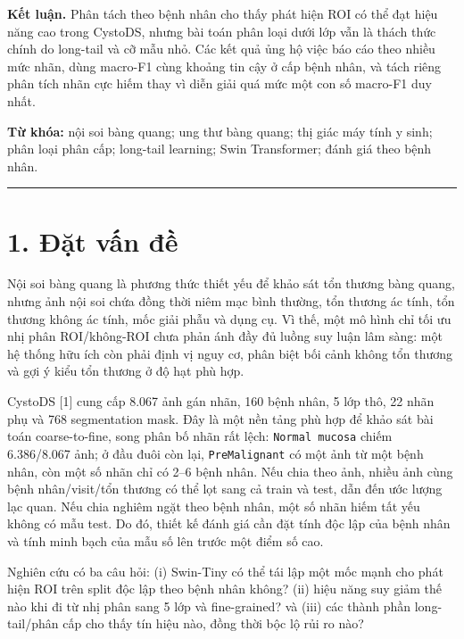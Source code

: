 \documentclass[
  10pt,
  a4paper,
  twocolumn]{article}
\begin{document}
\textbf{Kết luận.} Phân tách theo bệnh nhân cho thấy phát hiện ROI có
thể đạt hiệu năng cao trong CystoDS, nhưng bài toán phân loại dưới lớp
vẫn là thách thức chính do long-tail và cỡ mẫu nhỏ. Các kết quả ủng hộ
việc báo cáo theo nhiều mức nhãn, dùng macro-F1 cùng khoảng tin cậy ở
cấp bệnh nhân, và tách riêng phân tích nhãn cực hiếm thay vì diễn giải
quá mức một con số macro-F1 duy nhất.

\textbf{Từ khóa:} nội soi bàng quang; ung thư bàng quang; thị giác máy
tính y sinh; phân loại phân cấp; long-tail learning; Swin Transformer;
đánh giá theo bệnh nhân.

\begin{center}\rule{0.5\linewidth}{0.5pt}\end{center}

\section{1. Đặt vấn đề}\label{ux111ux1eb7t-vux1ea5n-ux111ux1ec1}

Nội soi bàng quang là phương thức thiết yếu để khảo sát tổn thương bàng
quang, nhưng ảnh nội soi chứa đồng thời niêm mạc bình thường, tổn thương
ác tính, tổn thương không ác tính, mốc giải phẫu và dụng cụ. Vì thế, một
mô hình chỉ tối ưu nhị phân ROI/không-ROI chưa phản ánh đầy đủ luồng suy
luận lâm sàng: một hệ thống hữu ích còn phải định vị nguy cơ, phân biệt
bối cảnh không tổn thương và gợi ý kiểu tổn thương ở độ hạt phù hợp.

CystoDS {[}1{]} cung cấp 8.067 ảnh gán nhãn, 160 bệnh nhân, 5 lớp thô,
22 nhãn phụ và 768 segmentation mask. Đây là một nền tảng phù hợp để
khảo sát bài toán coarse-to-fine, song phân bố nhãn rất lệch:
\texttt{Normal\ mucosa} chiếm 6.386/8.067 ảnh; ở đầu đuôi còn lại,
\texttt{PreMalignant} có một ảnh từ một bệnh nhân, còn một số nhãn chỉ
có 2--6 bệnh nhân. Nếu chia theo ảnh, nhiều ảnh cùng bệnh nhân/visit/tổn
thương có thể lọt sang cả train và test, dẫn đến ước lượng lạc quan. Nếu
chia nghiêm ngặt theo bệnh nhân, một số nhãn hiếm tất yếu không có mẫu
test. Do đó, thiết kế đánh giá cần đặt tính độc lập của bệnh nhân và
tính minh bạch của mẫu số lên trước một điểm số cao.

Nghiên cứu có ba câu hỏi: (i) Swin-Tiny có thể tái lập một mốc mạnh cho
phát hiện ROI trên split độc lập theo bệnh nhân không? (ii) hiệu năng
suy giảm thế nào khi đi từ nhị phân sang 5 lớp và fine-grained? và (iii)
các thành phần long-tail/phân cấp cho thấy tín hiệu nào, đồng thời bộc
lộ rủi ro nào?
\end{document}
